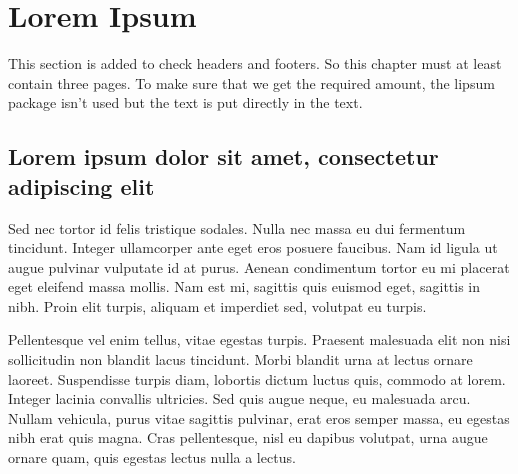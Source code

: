 \begin{table}
  \centering
  \caption{A table with the correct layout.}
  \label{tab:ok}
\end{table}

\section{Lorem Ipsum}
This section is added to check headers and footers. So this chapter must at
least contain three pages. To make sure that we get the required amount,
the \textsf{lipsum} package isn't used but the text is put directly in the
text.

\subsection{Lorem ipsum dolor sit amet, consectetur adipiscing elit}
Sed nec tortor id felis tristique sodales. Nulla nec massa eu dui fermentum
tincidunt. Integer ullamcorper ante eget eros posuere faucibus. Nam id
ligula ut augue pulvinar vulputate id at purus. Aenean condimentum tortor
eu mi placerat eget eleifend massa mollis. Nam est mi, sagittis quis
euismod eget, sagittis in nibh. Proin elit turpis, aliquam et imperdiet
sed, volutpat eu turpis.

Pellentesque vel enim tellus, vitae egestas turpis. Praesent malesuada elit
non nisi sollicitudin non blandit lacus tincidunt. Morbi blandit urna at
lectus ornare laoreet. Suspendisse turpis diam, lobortis dictum luctus
quis, commodo at lorem. Integer lacinia convallis ultricies. Sed quis augue
neque, eu malesuada arcu. Nullam vehicula, purus vitae sagittis pulvinar,
erat eros semper massa, eu egestas nibh erat quis magna. Cras pellentesque,
nisl eu dapibus volutpat, urna augue ornare quam, quis egestas lectus nulla
a lectus.

